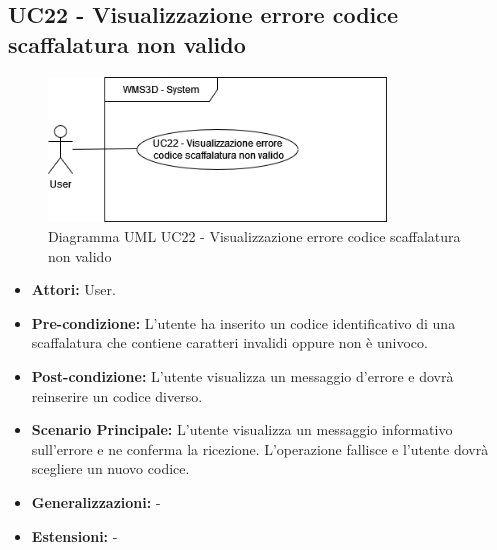 \subsection{UC22 - Visualizzazione errore codice scaffalatura non valido}
\begin{figure}[H]
  \centering
  \includegraphics[width=0.8\textwidth]{UC_diagrams_21-27/UC22.drawio.png}
   \caption{Diagramma UML UC22 - Visualizzazione errore codice scaffalatura non valido}
\end{figure}
\begin{itemize}
    \item \textbf{Attori:} User.
    \item \textbf{Pre-condizione:}  L'utente ha inserito un codice identificativo di una scaffalatura che contiene caratteri invalidi oppure non è univoco.
    \item \textbf{Post-condizione:}  L'utente visualizza un messaggio d'errore e dovrà reinserire un codice diverso.
    \item \textbf{Scenario Principale:}  L'utente visualizza un messaggio informativo sull'errore e ne conferma la ricezione. L'operazione fallisce e l'utente dovrà scegliere un nuovo codice.
    \item \textbf{Generalizzazioni:} -
    \item \textbf{Estensioni:} -
\end{itemize}